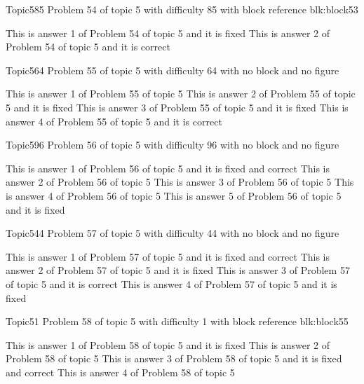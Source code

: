 \documentclass[master]{exam}
\begin{document}
\begin{problem}[requires=blk:block53]{Topic5}{85}
	Problem 54 of topic 5 with difficulty 85 with block reference blk:block53
	\begin{answers}
		\answer[fixed] This is answer 1 of Problem 54 of topic 5 and it is fixed
		\answer[correct] This is answer 2 of Problem 54 of topic 5 and it is correct
	\end{answers}
\end{problem}

\begin{problem}{Topic5}{64}
	Problem 55 of topic 5 with difficulty 64 with no block and no figure
	\begin{answers}
		\answer This is answer 1 of Problem 55 of topic 5 
		\answer[fixed] This is answer 2 of Problem 55 of topic 5 and it is fixed
		\answer[fixed] This is answer 3 of Problem 55 of topic 5 and it is fixed
		\answer[correct] This is answer 4 of Problem 55 of topic 5 and it is correct
	\end{answers}
\end{problem}

\begin{problem}{Topic5}{96}
	Problem 56 of topic 5 with difficulty 96 with no block and no figure
	\begin{answers}
		 This is answer 1 of Problem 56 of topic 5 and it is fixed and correct
		\answer This is answer 2 of Problem 56 of topic 5 
		\answer This is answer 3 of Problem 56 of topic 5 
		\answer This is answer 4 of Problem 56 of topic 5 
		\answer[fixed] This is answer 5 of Problem 56 of topic 5 and it is fixed
	\end{answers}
\end{problem}

\begin{problem}{Topic5}{44}
	Problem 57 of topic 5 with difficulty 44 with no block and no figure
	\begin{answers}
		 This is answer 1 of Problem 57 of topic 5 and it is fixed and correct
		\answer[fixed] This is answer 2 of Problem 57 of topic 5 and it is fixed
		\answer[correct] This is answer 3 of Problem 57 of topic 5 and it is correct
		\answer[fixed] This is answer 4 of Problem 57 of topic 5 and it is fixed
	\end{answers}
\end{problem}

\begin{problem}[requires=blk:block55]{Topic5}{1}
	Problem 58 of topic 5 with difficulty 1 with block reference blk:block55
	\begin{answers}
		\answer[fixed] This is answer 1 of Problem 58 of topic 5 and it is fixed
		\answer This is answer 2 of Problem 58 of topic 5 
		 This is answer 3 of Problem 58 of topic 5 and it is fixed and correct
		\answer This is answer 4 of Problem 58 of topic 5 
	\end{answers}
\end{problem}
\end{document}
